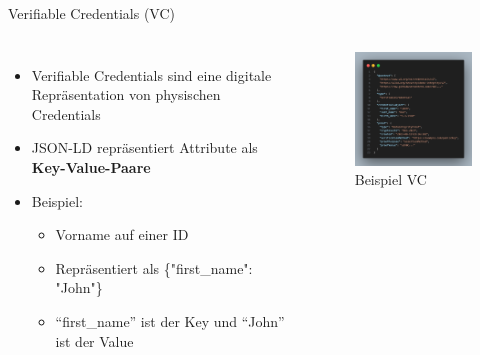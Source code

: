 \documentclass[
	german,%
	authorontitle=true,
	]{bfhbeamer}
\begin{document}
\begin{frame}{Verifiable Credentials (VC)}
    \begin{columns}[onlytextwidth,T]
        \column{70mm}  

    \begin{itemize}
        \item Verifiable Credentials sind eine digitale Repräsentation von physischen Credentials
        \item JSON-LD repräsentiert Attribute als \textbf{Key-Value-Paare}
        \item Beispiel:
        \begin{itemize}
            \item Vorname auf einer ID
            \item Repräsentiert als \{"first\_name": "John"\}
            \item ``first\_name'' ist der Key und ``John'' ist der Value
        \end{itemize}
    \end{itemize}

    \column{70mm}
    \begin{figure}
        \centering
        \includegraphics[width=60mm]{../img/VCSignExample.png}
        \caption{Beispiel VC}
    \end{figure}

    \end{columns}
\end{frame}
\end{document}
